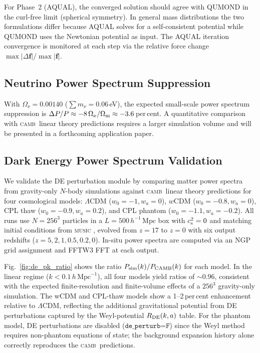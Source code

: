 \documentclass[fleqn,usenatbib]{mnras}
\newcommand{\camb}{\textsc{camb}}
\newcommand{\code}[1]{\texttt{#1}}
\newcommand{\Onu}{\Omega_\nu}
\newcommand{\Om}{\Omega_{\rm m}}
\newcommand{\Rde}{R_{\rm DE}}
\newcommand{\cst}{c_{\rm s}^2}
\begin{document}
For Phase~2 (AQUAL), the converged solution should agree with
QUMOND in the curl-free limit (spherical symmetry).  In general
mass distributions the two formulations differ because AQUAL solves
for a self-consistent potential while QUMOND uses the Newtonian
potential as input.  The AQUAL iteration convergence is monitored
at each step via the relative force change
$\max|\Delta\mathbf{f}|/\max|\mathbf{f}|$.

\subsection{Neutrino Power Spectrum Suppression}
\label{sec:verify_nu_pk}

With $\Onu = 0.00140$ ($\sum m_\nu = 0.06$\,eV), the expected
small-scale power spectrum suppression is
$\Delta P/P \approx -8\,\Onu/\Om \approx -3.6$\,per\,cent.
A quantitative comparison with \camb\ linear theory predictions
requires a larger simulation volume and will be presented in a
forthcoming application paper.

\subsection{Dark Energy Power Spectrum Validation}
\label{sec:verify_de_pk}

We validate the DE perturbation module by comparing matter power
spectra from gravity-only $N$-body simulations against \camb\ linear
theory predictions for four cosmological models:
$\Lambda$CDM ($w_0=-1, w_a=0$),
$w$CDM ($w_0=-0.8, w_a=0$),
CPL thaw ($w_0=-0.9, w_a=0.2$),
and CPL phantom ($w_0=-1.1, w_a=-0.2$).
All runs use $N=256^3$ particles in a $L=500\,h^{-1}\,\mathrm{Mpc}$
box with $\cst=0$ and matching initial conditions from \textsc{music}
\citep{Hahn2011}, evolved from $z=17$ to $z=0$ with six output
redshifts ($z=5, 2, 1, 0.5, 0.2, 0$).  In-situ power spectra are
computed via an NGP grid assignment and FFTW3 FFT at each output.

Fig.~\ref{fig:de_pk_ratio} shows the ratio
$P_{\rm sim}(k) / P_{\rm CAMB}(k)$ for each model.  In the linear
regime ($k < 0.1\,h\,\mathrm{Mpc}^{-1}$), all four models yield
ratios of ${\sim}0.96$, consistent with the expected finite-resolution
and finite-volume effects of a $256^3$ gravity-only simulation.
The wCDM and CPL-thaw models show a 1--2\,per\,cent enhancement
relative to $\Lambda$CDM, reflecting the additional gravitational
potential from DE perturbations captured by the Weyl-potential
$\Rde(k,a)$ table.  For the phantom model, DE perturbations are
disabled ($\code{de\_perturb=F}$) since the Weyl method requires
non-phantom equations of state; the background expansion history alone
correctly reproduces the \camb\ predictions.
\end{document}
